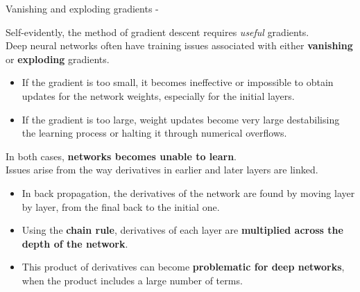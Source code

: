 
\begin{frame}[t,allowframebreaks]{
    Vanishing and exploding gradients -}

    Self-evidently, the method of 
    \gls{gradient descent}
    requires {\em useful} \glspl{gradient}.\\
    \vspace{0.2cm}
    Deep neural networks often have 
    training issues associated with either 
    {\bf vanishing} or {\bf exploding} \glspl{gradient}.\\
    \vspace{0.1cm}
    \begin{itemize}
        \small
        \item 
        If the \gls{gradient} is too small, 
        it becomes ineffective or impossible 
        to obtain updates for the network weights,
        especially for the initial layers.
        \item 
        If the \gls{gradient} is too large,
        weight updates become very large destabilising
        the learning process or halting it through numerical overflows. 
    \end{itemize}
    In both cases, {\bf networks becomes unable to learn}.\\
    \vspace{0.2cm}
    Issues arise from the way \glspl{derivative} in
    earlier and later layers are linked.\\
    \begin{itemize}
        \small
        \item
        In \gls{back propagation},
        the \glspl{derivative} of the network are found by moving 
        layer by layer, from the final back to the initial one.\\
        \item 
        Using the {\bf chain rule}, \glspl{derivative} of each layer
        are {\bf multiplied across the depth of the network}.
        \item 
        This product of \glspl{derivative} can become
        {\bf problematic for deep networks}, when the product
        includes a large number of terms.
    \end{itemize}

    \framebreak



\end{frame}

